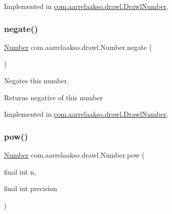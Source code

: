 Implemented in \hyperlink{classcom_1_1aarrelaakso_1_1drawl_1_1_drawl_number_a5595b3908527eb8a893f9c0a5d061677}{com.\+aarrelaakso.\+drawl.\+Drawl\+Number}.

\mbox{\label{interfacecom_1_1aarrelaakso_1_1drawl_1_1_number_abeb61241a83c318464f15c0059d65885}} 
\subsubsection{\texorpdfstring{negate()}{negate()}}
{\footnotesize\ttfamily \hyperlink{interfacecom_1_1aarrelaakso_1_1drawl_1_1_number}{Number} com.\+aarrelaakso.\+drawl.\+Number.\+negate (\begin{DoxyParamCaption}{ }\end{DoxyParamCaption})}



Negates this number. 

\begin{DoxyReturn}{Returns}
negative of this number 
\end{DoxyReturn}


Implemented in \hyperlink{classcom_1_1aarrelaakso_1_1drawl_1_1_drawl_number_a7cfa9c1e6042505b82277cb795cc84e3}{com.\+aarrelaakso.\+drawl.\+Drawl\+Number}.

\mbox{\label{interfacecom_1_1aarrelaakso_1_1drawl_1_1_number_a38679e8f0f11db201ee07e3b0541b6a4}} 
\subsubsection{\texorpdfstring{pow()}{pow()}}
{\footnotesize\ttfamily \hyperlink{interfacecom_1_1aarrelaakso_1_1drawl_1_1_number}{Number} com.\+aarrelaakso.\+drawl.\+Number.\+pow (\begin{DoxyParamCaption}\item[{final int}]{n,  }\item[{final int}]{precision }\end{DoxyParamCaption})}



